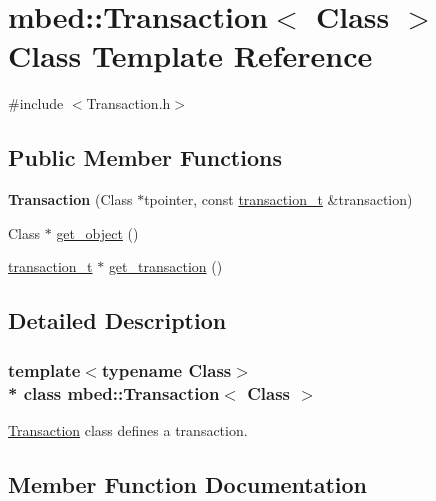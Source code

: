 \hypertarget{classmbed_1_1Transaction}{}\section{mbed\+:\+:Transaction$<$ Class $>$ Class Template Reference}
\label{classmbed_1_1Transaction}


{\ttfamily \#include $<$Transaction.\+h$>$}

\subsection*{Public Member Functions}
\begin{DoxyCompactItemize}
\item 
{\bfseries Transaction} (Class $\ast$tpointer, const \hyperlink{structmbed_1_1transaction__t}{transaction\+\_\+t} \&transaction)\hypertarget{classmbed_1_1Transaction_a8f185640162870544484447dddb655f3}{}\label{classmbed_1_1Transaction_a8f185640162870544484447dddb655f3}

\item 
Class $\ast$ \hyperlink{classmbed_1_1Transaction_a1cc189ffc187d991feada5305f895c94}{get\+\_\+object} ()
\item 
\hyperlink{structmbed_1_1transaction__t}{transaction\+\_\+t} $\ast$ \hyperlink{classmbed_1_1Transaction_a3f1bb2429fab5588c7127d640ea35236}{get\+\_\+transaction} ()
\end{DoxyCompactItemize}


\subsection{Detailed Description}
\subsubsection*{template$<$typename Class$>$\\*
class mbed\+::\+Transaction$<$ Class $>$}

\hyperlink{classmbed_1_1Transaction}{Transaction} class defines a transaction. 

\subsection{Member Function Documentation}
